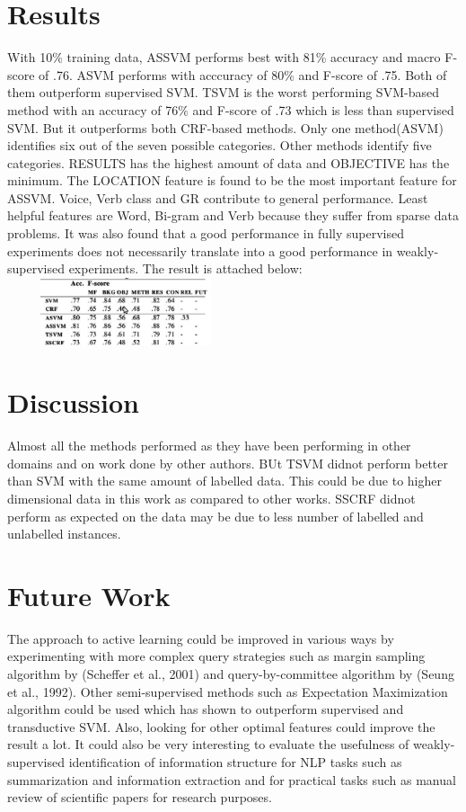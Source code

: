 \documentclass{article}
\begin{document}
\section{Results}
With 10\% training data, ASSVM performs best with 81\% accuracy and macro F-score of .76. ASVM performs with acccuracy of 80\% and F-score of .75. Both of them outperform  supervised SVM. TSVM is the worst performing SVM-based method with an accuracy of 76\% and F-score of .73 which is less than supervised SVM. But it outperforms both CRF-based methods. Only one method(ASVM) identifies six out of the seven possible categories. Other methods identify five categories. RESULTS has the highest amount of data and OBJECTIVE has the minimum. The LOCATION feature is found to be the most important feature for ASSVM. Voice, Verb class and GR contribute to general performance. Least helpful features are Word, Bi-gram and Verb because they suffer from sparse data problems. It was also found that a good performance in fully supervised experiments does not necessarily translate into a good performance in weakly-supervised experiments. The result is attached below:\\
\includegraphics[height=2cm,width=7cm]{2.eps}\\

\section{Discussion}
Almost all the methods performed as they have been performing in other domains and on work done by other authors. BUt TSVM didnot perform better than SVM with the same amount of labelled data. This could be due to higher dimensional data in this work as compared to other works. SSCRF didnot perform as expected on the data may be due to less number of labelled and unlabelled instances.

\section{Future Work}
The approach to active learning could be improved in various ways by experimenting with more complex query strategies such as margin sampling algorithm by (Scheffer et al., 2001) and query-by-committee algorithm by (Seung et al., 1992). Other semi-supervised methods such as Expectation Maximization algorithm could be used which has shown to outperform supervised and transductive SVM. Also, looking for other optimal features could improve the result a lot. It could also be very interesting to evaluate the usefulness of weakly-supervised identification of information structure for NLP tasks such as summarization and information extraction and for practical tasks such as manual review of scientific papers for research purposes.
\nocite{*}
{}

\end{document}
